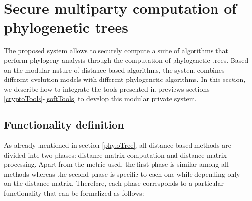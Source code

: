 \section{Secure multiparty computation of phylogenetic trees} \label{smcPhylo}

The proposed system allows to securely compute a suite of algorithms that perform phylogeny analysis through the computation of phylogenetic trees. Based on the modular nature of distance-based algorithms, the system combines different evolution models with different phylogenetic algorithms. In this section, we describe how to integrate the tools presented in previews sections \ref{cryptoTools}-\ref{softTools} to develop this modular private system. 



\subsection{Functionality definition}\label{Functionality}

As already mentioned in section \ref{phyloTree}, all distance-based methods are divided into two phases: distance matrix computation and distance matrix processing. Apart from the metric used, the first phase is similar among all methods whereas the second phase is specific to each one while depending only on the distance matrix. Therefore, each phase corresponds to a particular functionality that can be formalized as follows: 

